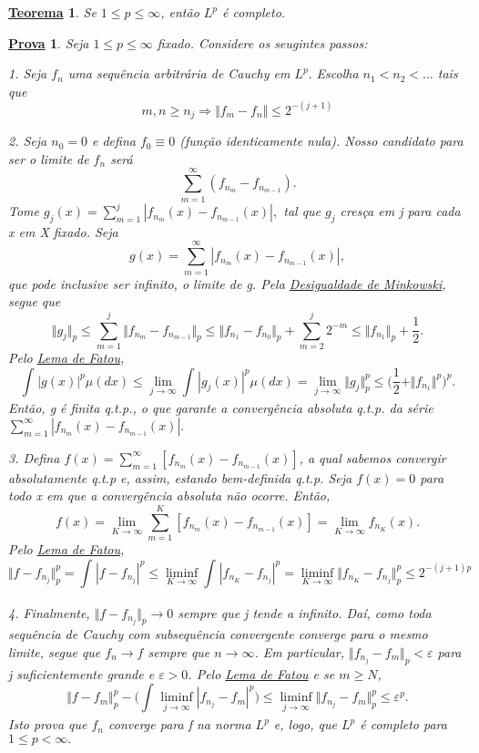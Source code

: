 \documentclass{article}
\newtheorem*{theorem*}{\underline{Teorema}}
\newtheorem*{proof*}{\underline{Prova}}
\begin{document}
 \begin{theorem*}
   Se \(1\leq p\leq \infty\), então \(L^{p}\) é completo.
 \end{theorem*}
\begin{proof*}
  Seja \(1\leq p\leq \infty\) fixado. Considere os seugintes passos: 
  
  1. Seja \(f_{n}\) uma sequência arbitrária de Cauchy em \(L^{p}.\) Escolha \(n_1 < n_2 <\dotsc \) tais que 
    \[
      m, n\geq n_{j}\Rightarrow \Vert f_{m} - f_{n} \Vert \leq 2^{-(j+1)}
    \]

  2. Seja \(n_{0} = 0\) e defina \(f_{0}\equiv 0\) (função identicamente nula). Nosso candidato para ser o limite de \(f_{n}\) será 
    \[
      \sum\limits_{m=1}^{\infty}(f_{n_{m}} - f_{n_{m-1}}).
    \]
  Tome \(g_{j}(x) = \sum\limits_{m=1}^{j}|f_{n_{m}}(x) - f_{n_{m-1}}(x)|,\) tal que \(g_{j}\) cresça em j para cada x em X fixado. Seja 
    \[
      g(x) = \sum\limits_{m=1}^{\infty}|f_{n_{m}}(x) - f_{n_{m-1}}(x)|,
    \]
  que pode inclusive ser infinito, o limite de g. Pela \hyperlink{minkowski}{\textit{Desigualdade de Minkowski}}, segue que 
    \[
      \Vert g_{j} \Vert_{p}\leq \sum\limits_{m=1}^{j}\Vert f_{n_{m}}-f_{n_{m-1}} \Vert_{p} \leq \Vert f_{n_{1}}-f_{n_{0}} \Vert_{p} + \sum\limits_{m=2}^{j}2^{-m}\leq \Vert f_{n_{1}} \Vert_{p}+\frac{1}{2}.
    \]
  Pelo \hyperlink{fatou}{\textit{Lema de Fatou}}, 
    \[
      \int_{}^{}|g(x)|^{p}\mu (dx)\leq \lim_{j\to \infty}\int_{}^{}|g_{j}(x)|^{p}\mu (dx) = \lim_{j\to \infty}\Vert g_{j} \Vert_{p}^{p}\leq \biggl(\frac{1}{2}+\Vert f_{n_1} \Vert^{p}\biggr)^{p}.
    \]
  Então, g é finita q.t.p., o que garante a convergência absoluta q.t.p. da série \(\sum\limits_{m=1}^{\infty}|f_{n_{m}}(x) - f_{n_{m-1}}(x)|.\)

  3. Defina \(f(x) = \sum\limits_{m=1}^{\infty}[f_{n_{m}}(x) - f_{n_{m-1}}(x)]\), a qual sabemos convergir absolutamente q.t.p e, assim, estando bem-definida q.t.p. Seja \(f(x) = 0\) para todo x em que a convergência absoluta não ocorre. Então,
    \[
      f(x) = \lim_{K\to \infty}\sum\limits_{m=1}^{K}[f_{n_{m}}(x) - f_{n_{m-1}}(x)] = \lim_{K\to \infty}f_{n_{K}}(x).
    \] 
  Pelo \hyperlink{fatou}{\textit{Lema de Fatou}}, 
    \[
      \Vert f - f_{n_{j}} \Vert_{p}^{p} = \int_{}^{}|f-f_{n_{j}}|^{p}\leq \liminf_{K\to \infty}\int_{}^{}|f_{n_{K}}-f_{n_{j}}|^{p} = \liminf_{K\to \infty}\Vert f_{n_{K}}-f_{n_{j}} \Vert_{p}^{p} \leq 2^{-(j+1)p}
    \]
  
  4. Finalmente, \(\Vert f - f_{n_{j}} \Vert_{p}\to 0\) sempre que j tende a infinito. Daí, como toda sequência de Cauchy com subsequência convergente converge para o mesmo limite, segue que \(f_{n}\to f\) sempre que \(n\to \infty\).
Em particular, \(\Vert f_{n_{j}} - f_{m}\Vert_{p}<\varepsilon \) para j suficientemente grande e \(\varepsilon  > 0\). Pelo \hyperlink{fatou}{\textit{Lema de Fatou}} e se \(m\geq N\),
  \[
    \Vert f-f_{m} \Vert_{p}^{p} - \biggl(\int_{}^{}\liminf_{j\to \infty}|f_{n_{j}}-f_{m}|^{p}\biggr) \leq \liminf_{j\to \infty}\Vert f_{n_{j}}-f_{m} \Vert_{p}^{p}\leq \varepsilon^{p}.
  \]
  Isto prova que \(f_{n}\) converge para f na norma \(L^{p}\) e, logo, que \(L^{p}\) é completo para \(1\leq p < \infty.\)


\end{proof*}
\end{document}
